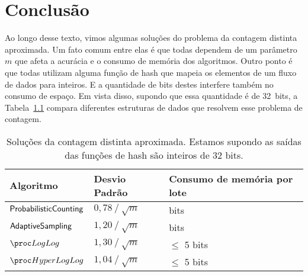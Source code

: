 \chapter{Conclusão}

Ao longo desse texto, vimos algumas soluções do problema da contagem distinta aproximada. Um fato comum entre elas é que
todas dependem de um parâmetro~$m$ que afeta a acurácia e o consumo de memória dos algoritmos. Outro ponto é que todas
utilizam alguma função de hash que mapeia os elementos de um fluxo de dados para inteiros. E a quantidade de bits destes
interfere também no consumo de espaço. Em vista disso, supondo que essa quantidade é de 32~bits, a 
Tabela~\ref{tab:comparar} compara diferentes estruturas de dados que resolvem esse problema de contagem.

\begin{center}
  \def\arraystretch{2}%
  \begin{table}
    \begin{tabular}{ |p{5cm}||p{2.5cm}|p{6cm}|  }
      \hline
      \multicolumn{1}{|p{5cm}|}{\centering Algoritmo } 
      & \multicolumn{1}{|p{2.5cm}|}{\centering Desvio Padrão }  
      & \multicolumn{1}{|p{6cm}|}{\centering Consumo de memória por lote } \\
      \hline
      \multicolumn{1}{|p{5cm}|}{\centering \hyperref[sec:flajolet-martin:algorithm]{$\textsf{ProbabilisticCounting}$} } 
      & \multicolumn{1}{|p{2.5cm}|}{\centering $0{,}78 \mathbin{/} \sqrt{m}$ }
      & \multicolumn{1}{|p{6cm}|}{\centering 32 bits } \\
      \hline
      \multicolumn{1}{|p{5cm}|}{\centering \hyperref[lab:chapter:04:01]{$\textsf{AdaptiveSampling}$} } 
      & \multicolumn{1}{|p{2.5cm}|}{\centering $1{,}20 \mathbin{/} \sqrt{m}$ }
      & \multicolumn{1}{|p{6cm}|}{\centering 32 bits } \\
      \hline
      \multicolumn{1}{|p{5cm}|}{\centering \hyperref[sec:loglog:algorithm]{$\LOG$} } 
      & \multicolumn{1}{|p{2.5cm}|}{\centering $1{,}30 \mathbin{/} \sqrt{m}$ }
      & \multicolumn{1}{|p{6cm}|}{\centering $\leq$ 5 bits } \\
      \hline
      \multicolumn{1}{|p{5cm}|}{\centering \hyperref[sec:loglog:hyperloglog]{$\HLOG$} } 
      & \multicolumn{1}{|p{2.5cm}|}{\centering $1{,}04 \mathbin{/} \sqrt{m}$ }
      & \multicolumn{1}{|p{6cm}|}{\centering $\leq$ 5 bits } \\
      \hline
     \end{tabular}
     \caption{\label{tab:comparar} Soluções da contagem distinta aproximada. Estamos supondo as saídas das funções de 
     hash são inteiros de 32 bits.}
  \end{table}
\end{center}


